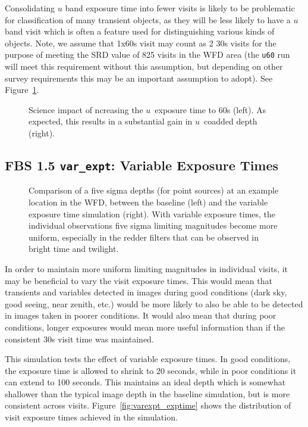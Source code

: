 Consolidating $u$ band exposure time into fewer visits is likely to be problematic for classification of many transient objects, as they will be less likely to have a $u$ band visit which is often a feature used for distinguishing various kinds of objects. Note, we assume that 1x60s visit may count as 2 30s visits for the purpose of meeting the SRD value of 825 visits in the WFD area (the {\tt u60} run will meet this requirement without this assumption, but depending on other survey requirements this may be an important assumption to adopt). See Figure~\ref{fig:u60_radar}. 

\begin{figure}
\caption{Science impact of ncreasing the $u$\ exposure time to 60s (left).  As expected, this results in a substantial gain in $u$\ coadded depth (right).}
\label{fig:u60_radar}
\end{figure}

\subsection{FBS 1.5 {\tt var\_expt}: Variable Exposure Times}\label{ss:varexp}

\begin{figure}
\caption{Comparison of a five sigma depths (for point sources) at an example location in the WFD, between the baseline (left) and the variable exposure time simulation (right). With variable exposure times, the individual observations five sigma limiting magnitudes become more uniform, especially in the redder filters that can be observed in bright time and twilight.}\label{fig:varexptime}
\end{figure}

In order to maintain more uniform limiting magnitudes in individual visits, it may be beneficial to vary the visit exposure times. This would mean that transients and variables detected in images during good conditions (dark sky, good seeing, near zenith, etc.) would be more likely to also be able to be detected in images taken in poorer conditions. It would also mean that during poor conditions, longer exposures would mean more useful information than if the consistent 30s visit time was maintained. 

This simulation tests the effect of variable exposure times. In good conditions, the exposure time is allowed to shrink to 20 seconds, while in poor conditions it can extend to 100 seconds. This maintains an ideal depth which is somewhat shallower than the typical image depth in the baseline simulation, but is more consistent across visits. Figure~\ref{fig:varexpt_exptime} shows the distribution of visit exposure times achieved in the simulation. 

